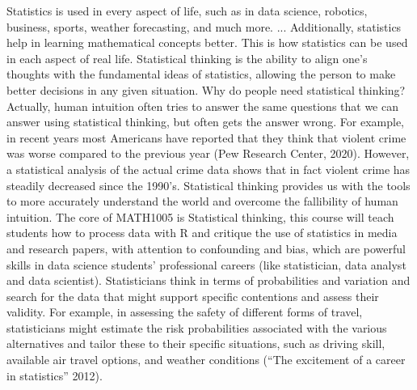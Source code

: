 \documentclass{article}
\begin{document}
Statistics is used in every aspect of life, such as in data science, robotics, business, sports, weather forecasting, and much more. ... Additionally, statistics help in learning mathematical concepts better. This is how statistics can be used in each aspect of real life. Statistical thinking is the ability to align one’s thoughts with the fundamental ideas of statistics, allowing the person to make better decisions in any given situation. Why do people need statistical thinking? Actually, human intuition often tries to answer the same questions that we can answer using statistical thinking, but often gets the answer wrong. For example, in recent years most Americans have reported that they think that violent crime was worse compared to the previous year (Pew Research Center, 2020). However, a statistical analysis of the actual crime data shows that in fact violent crime has steadily decreased since the 1990’s. Statistical thinking provides us with the tools to more accurately understand the world and overcome the fallibility of human intuition. The core of MATH1005 is Statistical thinking, this course will teach students how to process data with R and critique the use of statistics in media and research papers, with attention to confounding and bias, which are powerful skills in data science students' professional careers (like statistician, data analyst and data scientist). Statisticians think in terms of probabilities and variation and search for the data that might support specific contentions and assess their validity. For example, in assessing the safety of different forms of travel, statisticians might estimate the risk probabilities associated with the various alternatives and tailor these to their specific situations, such as driving skill, available air travel options, and weather conditions (“The excitement of a career in statistics” 2012).
\end{document}
